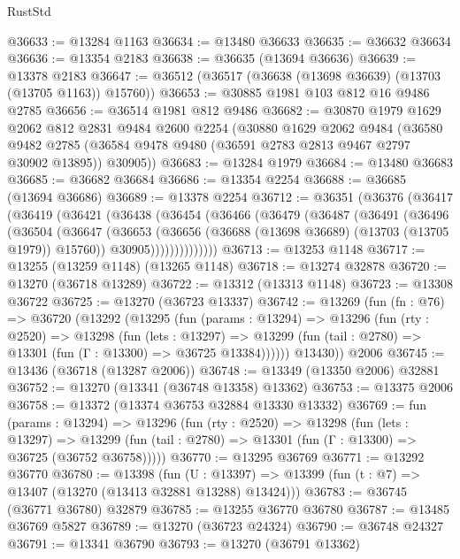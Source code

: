 \begin{lexlean}{RustStd}
\begin{coremodule}
@36633 := @13284 @1163
@36634 := @13480 @36633
@36635 := @36632 @36634
@36636 := @13354 @2183
@36638 := @36635 (@13694 @36636)
@36639 := @13378 @2183
@36647 := @36512 (@36517 (@36638 (@13698 @36639) (@13703 (@13705 @1163)) @15760))
@36653 := @30885 @1981 @103 @812 @16 @9486 @2785
@36656 := @36514 @1981 @812 @9486
@36682 := @30870
    @1979
    @1629
    @2062
    @812
    @2831
    @9484
    @2600
    @2254
    (@30880
      @1629
      @2062
      @9484
      (@36580
        @9482
        @2785
        (@36584 @9478 @9480 (@36591 @2783 @2813 @9467 @2797 @30902 @13895))
        @30905))
@36683 := @13284 @1979
@36684 := @13480 @36683
@36685 := @36682 @36684
@36686 := @13354 @2254
@36688 := @36685 (@13694 @36686)
@36689 := @13378 @2254
@36712 := @36351
    (@36376
      (@36417
        (@36419
          (@36421
            (@36438
              (@36454
                (@36466
                  (@36479
                    (@36487
                      (@36491
                        (@36496
                          (@36504
                            (@36647
                              (@36653
                                (@36656 (@36688 (@13698 @36689) (@13703 (@13705 @1979)) @15760))
                                @30905))))))))))))))
@36713 := @13253 @1148
@36717 := @13255 (@13259 @1148) (@13265 @1148)
@36718 := @13274 @32878
@36720 := @13270 (@36718 @13289)
@36722 := @13312 (@13313 @1148)
@36723 := @13308 @36722
@36725 := @13270 (@36723 @13337)
@36742 := @13269
    (fun (fn : @76) =>
    @36720
      (@13292
        (@13295
          (fun (params : @13294) =>
          @13296
            (fun (rty : @2520) =>
            @13298
              (fun (lets : @13297) =>
              @13299 (fun (tail : @2780) => @13301 (fun (Γ : @13300) => @36725 @13384))))))
        @13430))
    @2006
@36745 := @13436 (@36718 (@13287 @2006))
@36748 := @13349 (@13350 @2006) @32881
@36752 := @13270 (@13341 (@36748 @13358) @13362)
@36753 := @13375 @2006
@36758 := @13372 (@13374 @36753 @32884 @13330 @13332)
@36769 := fun (params : @13294) =>
  @13296
    (fun (rty : @2520) =>
    @13298
      (fun (lets : @13297) =>
      @13299 (fun (tail : @2780) => @13301 (fun (Γ : @13300) => @36725 (@36752 @36758)))))
@36770 := @13295 @36769
@36771 := @13292 @36770
@36780 := @13398
    (fun (U : @13397) => @13399 (fun (t : @7) => @13407 (@13270 (@13413 @32881 @13288) @13424)))
@36783 := @36745 (@36771 @36780) @32879
@36785 := @13255 @36770 @36780
@36787 := @13485 @36769 @5827
@36789 := @13270 (@36723 @24324)
@36790 := @36748 @24327
@36791 := @13341 @36790
@36793 := @13270 (@36791 @13362)

\end{coremodule}
\end{lexlean}
